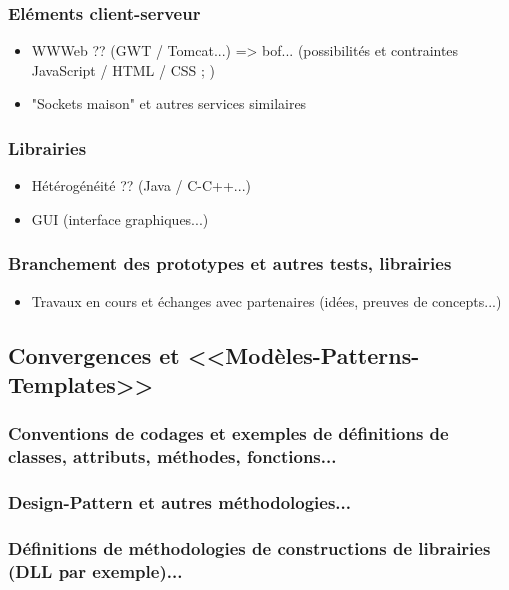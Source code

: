 \documentclass[11pt,twoside,a4paper]{article}
\begin{document}
\subsubsection{El{\'e}ments client-serveur}
	\begin{itemize}
		\item WWWeb ?? (GWT / Tomcat...) => bof... (possibilit{\'e}s et contraintes JavaScript / HTML / CSS ; )
		\item "Sockets maison" et autres services similaires
	\end{itemize}

\subsubsection{Librairies}
	\begin{itemize}
		\item H{\'e}t{\'e}rog{\'e}n{\'e}it{\'e} ?? (Java / C-C++...)
		\item GUI (interface graphiques...)
	\end{itemize}

\subsubsection{Branchement des prototypes et autres tests, librairies}
	\begin{itemize}
		\item Travaux en cours et {\'e}changes avec partenaires (id{\'e}es, preuves de concepts...)
	\end{itemize}
	
\subsection{Convergences et <<Mod{\`e}les-Patterns-Templates>>}

\subsubsection{Conventions de codages et exemples de d{\'e}finitions de classes, attributs, m{\'e}thodes, fonctions...}

\subsubsection{Design-Pattern et autres m{\'e}thodologies...}

\subsubsection{D{\'e}finitions de m{\'e}thodologies de constructions de librairies (DLL par exemple)...}
\end{document}
